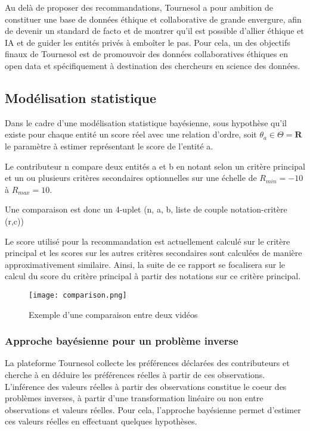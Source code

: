 Au delà de proposer des recommandations, Tournesol a pour ambition de constituer une base de données éthique et collaborative de grande envergure, afin de devenir un standard de facto et de montrer qu'il est possible d'allier éthique et IA et de guider les entités privés à emboîter le pas. Pour cela, un des objectifs finaux de Tournesol est de promouvoir des données collaboratives éthiques en open data et spécifiquement à destination des chercheurs en science des données.

\subsection{Modélisation statistique}

Dans le cadre d'une modélisation statistique bayésienne, sous hypothèse qu'il existe pour chaque entité un score réel avec une relation d'ordre, soit $\theta_{a}\in\Theta=\mathbf{R}$ le paramètre à estimer représentant le score de l'entité a.

Le contributeur n compare deux entités a et b en notant selon un critère principal et un ou plusieurs critères secondaires optionnelles sur une échelle de $R_{min}=-10$ à $R_{max}=10$.

Une comparaison est donc un 4-uplet (n, a, b, liste de couple notation-critère (r,c))

Le score utilisé pour la recommandation est actuellement calculé sur le critère principal et les scores sur les autres critères secondaires sont calculées de manière approximativement similaire. Ainsi, la suite de ce rapport se focalisera sur le calcul du score du critère principal à partir des notations sur ce critère principal.

\begin{figure}[ht]
  \texttt{[image: comparison.png]}
  \caption{Exemple d'une comparaison entre deux vidéos}
\end{figure}
\subsubsection{Approche bayésienne pour un problème inverse}

La plateforme Tournesol collecte les préférences déclarées des contributeurs et cherche à en déduire les préférences réelles à partir de ces observations. L'inférence des valeurs réelles à partir des observations constitue le coeur des problèmes inverses, à partir d'une transformation linéaire ou non entre observations et valeurs réelles. Pour cela, l'approche bayésienne permet d'estimer ces valeurs réelles en effectuant quelques hypothèses.


